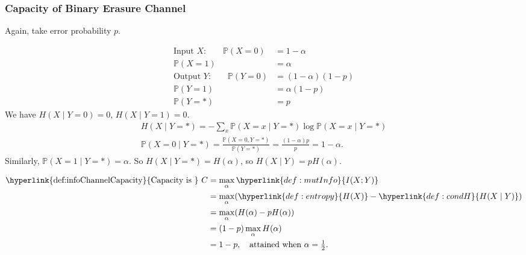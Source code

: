 \documentclass{article}
\newcommand{\Prob}{\mathbb{P}}
\newcommand{\1}[1]{\mathbbm{1}_{#1}}
\begin{document}
\subsubsection*{Capacity of Binary Erasure Channel}
Again, take error probability $p$.
\begin{center}
\end{center}
\begin{align*}
    \text{Input $X$:} \qquad \Prob(X=0) &= 1-\alpha \\
    \Prob(X=1) &= \alpha \\
    \text{Output $Y$:} \qquad
    \Prob(Y=0) &= (1-\alpha)(1-p)\\
    \Prob(Y=1) &= \alpha (1-p) \\
    \Prob(Y=*) &= p
\end{align*}
We have $H(X \mid Y=0) = 0$, $H(X \mid Y=1)=0$.
\begin{gather*}
    H(X \mid Y=*) = - \sum_x \Prob(X=x \mid Y=*) \log \Prob(X=x \mid Y=*) \\
    \Prob(X=0 \mid Y=*) = \frac{\Prob(X=0, Y=*)}{\Prob(Y=*)} = \frac{(1-\alpha)p}{p} = 1-\alpha.
\end{gather*}
Similarly, $\Prob(X=1 \mid Y=*) = \alpha$.
So $H(X \mid Y=*) = H(\alpha)$, so $H(X \mid Y) = p H(\alpha)$.

\begin{align*}
    \text{\hyperlink{def:infoChannelCapacity}{Capacity is } }C &= \max_\alpha \hyperlink{def:mutInfo}{I(X;Y)} \\
      &= \max_\alpha (\hyperlink{def:entropy}{H(X)} - \hyperlink{def:condH}{H(X \mid Y)}) \\
      &= \max_\alpha (H(\alpha) - pH(\alpha)) \\
      &= (1-p) \max_\alpha H(\alpha) \\
      &= 1 -p, \quad \text{attained when } \alpha = \tfrac{1}{2}.
\end{align*}
\end{document}
